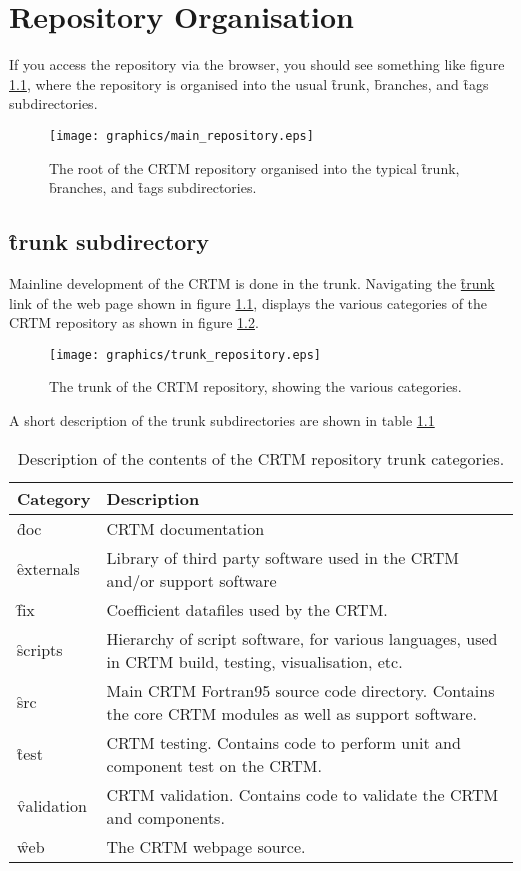 \chapter{Repository Organisation}
If you access the repository via the \trac{} browser, you should see something like figure \ref{fig:main_repository}, where the repository is organised into the usual \f{trunk}, \f{branches}, and \f{tags} subdirectories.
\begin{figure}[htb]
  \centering
  \texttt{[image: graphics/main\_repository.eps]}
  \caption{The root of the CRTM repository organised into the typical \f{trunk}, \f{branches}, and \f{tags} subdirectories.}
  \label{fig:main_repository}
\end{figure}

\section{\f{trunk} subdirectory}
Mainline development of the CRTM is done in the trunk. Navigating the \href{https://svnemc.ncep.noaa.gov/projects/crtm/trunk}{\f{trunk}} link of the web page shown in figure \ref{fig:main_repository}, displays the various categories of the CRTM repository as shown in figure \ref{fig:trunk_repository}. 
\begin{figure}[htb]
  \centering
  \texttt{[image: graphics/trunk\_repository.eps]}
  \caption{The trunk of the CRTM repository, showing the various categories.}
  \label{fig:trunk_repository}
\end{figure}
A short description of the trunk subdirectories are shown in table \ref{tab:trunk_category_description}
\begin{table}[htb]
  \centering
  \begin{tabular}{p{2cm} p{12cm}}
    \hline
    \sffamily\textbf{Category} & \sffamily\textbf{Description} \\
    \hline\hline
    \f{doc}       & CRTM documentation\\
    \f{externals} & Library of third party software used in the CRTM and/or support software\\
    \f{fix}       & Coefficient datafiles used by the CRTM.\\
    \f{scripts}   & Hierarchy of script software, for various languages, used in CRTM build, testing, visualisation, etc.\\
    \f{src}       & Main CRTM Fortran95 source code directory. Contains the core CRTM modules as well as support software.\\
    \f{test}      & CRTM testing. Contains code to perform unit and component test on the CRTM.\\
    \f{validation} & CRTM validation. Contains code to validate the CRTM and components.\\
    \f{web}       & The CRTM webpage source.\\
    \hline
  \end{tabular}
  \caption{Description of the contents of the CRTM repository trunk categories.}
  \label{tab:trunk_category_description}
\end{table}

